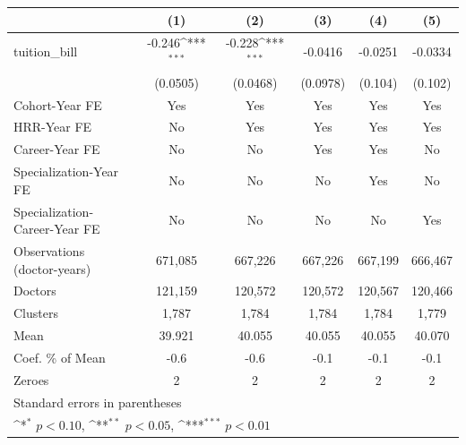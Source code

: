 {
\def\sym#1{\ifmmode^{#1}\else\(^{#1}\)\fi}
\begin{tabular}{l*{5}{c}}
\hline\hline
                    &\multicolumn{1}{c}{(1)}         &\multicolumn{1}{c}{(2)}         &\multicolumn{1}{c}{(3)}         &\multicolumn{1}{c}{(4)}         &\multicolumn{1}{c}{(5)}         \\
\hline
tuition\_bill        &      -0.246\sym{***}&      -0.228\sym{***}&     -0.0416         &     -0.0251         &     -0.0334         \\
                    &    (0.0505)         &    (0.0468)         &    (0.0978)         &     (0.104)         &     (0.102)         \\
[1em]
Cohort-Year FE      &         Yes         &         Yes         &         Yes         &         Yes         &         Yes         \\
[1em]
HRR-Year FE         &          No         &         Yes         &         Yes         &         Yes         &         Yes         \\
[1em]
Career-Year FE      &          No         &          No         &         Yes         &         Yes         &          No         \\
[1em]
Specialization-Year FE&          No         &          No         &          No         &         Yes         &          No         \\
[1em]
Specialization-Career-Year FE&          No         &          No         &          No         &          No         &         Yes         \\
\hline
Observations (doctor-years)&     671,085         &     667,226         &     667,226         &     667,199         &     666,467         \\
Doctors             &     121,159         &     120,572         &     120,572         &     120,567         &     120,466         \\
Clusters            &       1,787         &       1,784         &       1,784         &       1,784         &       1,779         \\
Mean                &      39.921         &      40.055         &      40.055         &      40.055         &      40.070         \\
Coef. \% of Mean    &        -0.6         &        -0.6         &        -0.1         &        -0.1         &        -0.1         \\
Zeroes              &           2         &           2         &           2         &           2         &           2         \\
\hline\hline
\multicolumn{6}{l}{\footnotesize Standard errors in parentheses}\\
\multicolumn{6}{l}{\footnotesize \sym{*} \(p<0.10\), \sym{**} \(p<0.05\), \sym{***} \(p<0.01\)}\\
\end{tabular}
}
